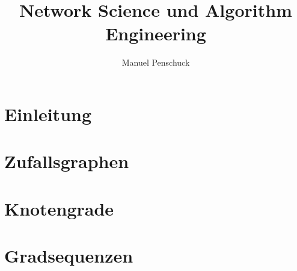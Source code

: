 \documentclass[%
	11pt,%
	ngerman,%
]{book}
\title{Network Science und Algorithm Engineering}
\author{Manuel Penschuck}
\begin{document}
\maketitle

\clearpage

\tableofcontents

\chapter{Einleitung}


\chapter{Zufallsgraphen}


\chapter{Knotengrade}


\chapter{Gradsequenzen}


\cleardoublepage
{}
\fancyhead[RO]{}
\thispagestyle{fancy}
\pagestyle{fancy}

\small
\patchcmd{\thebibliography}{\chapter*}{\section*}{}{}

\end{document}
